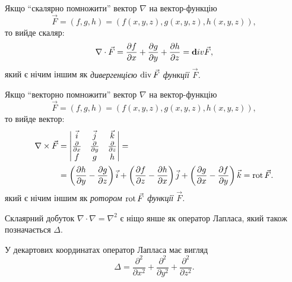\begin{definition}
	Якщо ``скалярно помножити'' вектор $\nabla$ на вектор-функцію
	\begin{equation}
	    \vec{F} = (f, g, h) = (f(x, y, z), g(x, y, z), h(x, y, z)),
	\end{equation}
	то вийде скаляр:
	\begin{equation}
    	\nabla \cdot \vec{F} = \frac{\partial f}{\partial x} + \frac{\partial g}{\partial y} + \frac{\partial h}{\partial z} = {\bf div} \vec{F},
    \end{equation}
    який є нічим іншим як \it{дивергенцією} $\divergence \vec{F}$ функції $\vec{F}$.
\end{definition}

\begin{definition}
	Якщо ``векторно помножити'' вектор $\nabla$ на вектор-функцію
	\begin{equation}
	    \vec{F} = (f, g, h) = (f(x, y, z), g(x, y, z), h(x, y, z)),
	\end{equation}
	то вийде вектор:
	\begin{equation}
    	\begin{aligned}
        	\nabla \times \vec{F} &= \begin{vmatrix}
        		\vec{i} & \vec{j} & \vec{k} \\
        		\frac{\partial}{\partial x} & \frac{\partial}{\partial y} & \frac{\partial}{\partial z} \\
        		f & g & h
    		\end{vmatrix} = \\
    		&= \left( \frac{\partial h}{\partial y} - \frac{\partial g}{\partial z} \right) \vec{i} + \left( \frac{\partial f}{\partial z} - \frac{\partial h}{\partial x} \right) \vec{j} + \left( \frac{\partial g}{\partial x} - \frac{\partial f}{\partial y} \right) \vec{k} = \rot \vec{F}.
    	\end{aligned}
    \end{equation}
    який є нічим іншим як \it{ротором} $\rot \vec{F}$ функції $\vec{F}$.
\end{definition}

\begin{definition}
	Склаярний добуток $\nabla \cdot \nabla = \nabla^2$ є ніщо янше як оператор Лапласа, який також позначається $\Delta$. \medskip

	У декартових координатах оператор Лапласа має вигляд
	\begin{equation}
    	\Delta = \frac{\partial^2}{\partial x^2} + \frac{\partial^2}{\partial y^2} + \frac{\partial^2}{\partial z^2}.
    \end{equation}
\end{definition}

